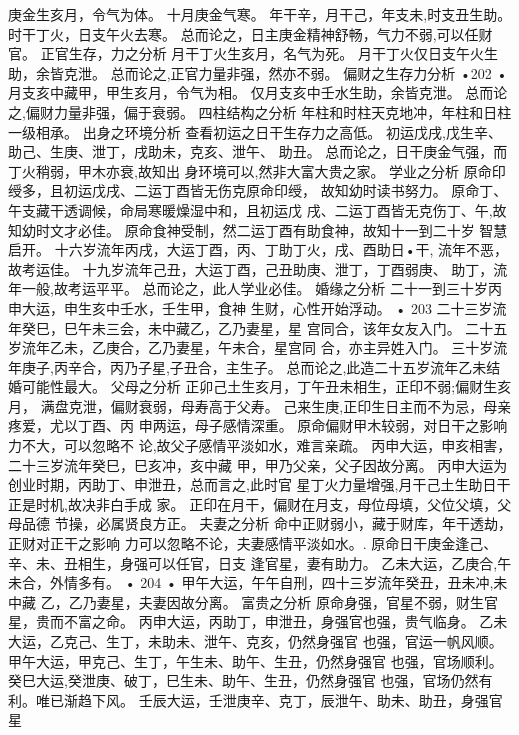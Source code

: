 庚金生亥月，令气为体。
十月庚金气寒。
年干辛，月干己，年支未,时支丑生助。
时干丁火，日支午火去寒。
总而论之，日主庚金精神舒畅，气力不弱,可以任财官。
正官生存，力之分析
月干丁火生亥月，名气为死。
月干丁火仅日支午火生助，余皆克泄。
总而论之,正官力量非强，然亦不弱。
偏财之生存力分析
•202 •
月支亥中藏甲，甲生亥月，令气为相。
仅月支亥中壬水生助，余皆克泄。
总而论之,偏财力量非强，偏于衰弱。
四柱结构之分析
年柱和时柱天克地冲，年柱和日柱一级相承。
出身之环境分析
查看初运之日干生存力之高低。
初运戊戌,戊生辛、助己、生庚、泄丁，戌助未，克亥、泄午、
助丑。
总而论之，日干庚金气强，而丁火稍弱，甲木亦衰,故知出
身环境可以,然非大富大贵之家。
学业之分析
原命印绶多，且初运戊戌、二运丁酉皆无伤克原命印绶，
故知幼时读书努力。
原命丁、午支藏干透调候，命局寒暖燥湿中和，且初运戊
戌、二运丁酉皆无克伤丁、午,故知幼时文才必佳。
原命食神受制，然二运丁酉有助食神，故知十一到二十岁
智慧启开。
十六岁流年丙戌，大运丁酉，丙、丁助丁火，戌、酉助日•干,
流年不恶，故考运佳。
十九岁流年己丑，大运丁酉，己丑助庚、泄丁，丁酉弱庚、
助丁，流年一般,故考运平平。
总而论之，此人学业必佳。
婚缘之分析
二十一到三十岁丙申大运，申生亥中壬水，壬生甲，食神
生财，心性开始浮动。
• 203 
二十三岁流年癸巳，巳午未三会，未中藏乙，乙乃妻星，星
宫同合，该年女友入门。
二十五岁流年乙未，乙庚合，乙乃妻星，午未合，星宫同
合，亦主异姓入门。
三十岁流年庚子,丙辛合，丙乃子星,子丑合，主生子。
总而论之,此造二十五岁流年乙未结婚可能性最大。
父母之分析
正卯己土生亥月，丁午丑未相生，正印不弱;偏财生亥月，
满盘克泄，偏财衰弱，母寿高于父寿。
己来生庚,正印生日主而不为忌，母亲疼爱，尤以丁酉、丙
申两运，母子感情深重。
原命偏财甲木较弱，对日干之影响力不大，可以忽略不
论,故父子感情平淡如水，难言亲疏。
丙申大运，申亥相害，二十三岁流年癸巳，巳亥冲，亥中藏
甲，甲乃父亲，父子因故分离。
丙申大运为创业时期，丙助丁、申泄丑，总而言之,此时官
星丁火力量增强,月干己土生助日干正是时机,故决非白手成
家。
正印在月干，偏财在月支，母位母填，父位父填，父母品德
节操，必属贤良方正。
夫妻之分析
命中正财弱小，藏于财库，年干透劫，正财对正干之影响
力可以忽略不论，夫妻感情平淡如水。.
原命日干庚金逢己、辛、未、丑相生，身强可以任官，日支
逢官星，妻有助力。
乙未大运，乙庚合,午未合，外情多有。
• 204 •
甲午大运，午午自刑，四十三岁流年癸丑，丑未冲,未中藏
乙，乙乃妻星，夫妻因故分离。
富贵之分析
原命身强，官星不弱，财生官星，贵而不富之命。
丙申大运，丙助丁，申泄丑，身强官也强，贵气临身。
乙未大运，乙克己、生丁，未助未、泄午、克亥，仍然身强官
也强，官运一帆风顺。
甲午大运，甲克己、生丁，午生未、助午、生丑，仍然身强官
也强，官场顺利。
癸巳大运,癸泄庚、破丁，巳生未、助午、生丑，仍然身强官
也强，官场仍然有利。唯已渐趋下风。
壬辰大运，壬泄庚辛、克丁，辰泄午、助未、助丑，身强官星
